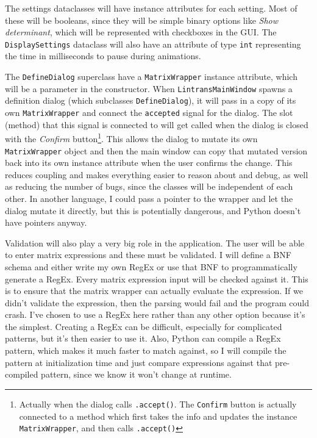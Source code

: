 \documentclass[../main.tex]{subfiles}
\begin{document}
The settings dataclasses will have instance attributes for each setting. Most of these will be booleans, since they will be simple binary options like \textit{Show determinant}, which will be represented with checkboxes in the GUI. The \texttt{DisplaySettings} dataclass will also have an attribute of type \texttt{int} representing the time in milliseconds to pause during animations.

The \texttt{DefineDialog} superclass have a \texttt{MatrixWrapper} instance attribute, which will be a parameter in the constructor. When \texttt{LintransMainWindow} spawns a definition dialog (which subclasses \texttt{DefineDialog}), it will pass in a copy of its own \texttt{MatrixWrapper} and connect the \texttt{accepted} signal for the dialog. The slot (method) that this signal is connected to will get called when the dialog is closed with the \textit{Confirm} button\footnote{Actually when the dialog calls \texttt{.accept()}. The \texttt{Confirm} button is actually connected to a method which first takes the info and updates the instance \texttt{MatrixWrapper}, and then calls \texttt{.accept()}}. This allows the dialog to mutate its own \texttt{MatrixWrapper} object and then the main window can copy that mutated version back into its own instance attribute when the user confirms the change. This reduces coupling and makes everything easier to reason about and debug, as well as reducing the number of bugs, since the classes will be independent of each other. In another language, I could pass a pointer to the wrapper and let the dialog mutate it directly, but this is potentially dangerous, and Python doesn't have pointers anyway.

Validation will also play a very big role in the application. The user will be able to enter matrix expressions and these must be validated. I will define a BNF schema and either write my own RegEx or use that BNF to programmatically generate a RegEx. Every matrix expression input will be checked against it. This is to ensure that the matrix wrapper can actually evaluate the expression. If we didn't validate the expression, then the parsing would fail and the program could crash. I've chosen to use a RegEx here rather than any other option because it's the simplest. Creating a RegEx can be difficult, especially for complicated patterns, but it's then easier to use it. Also, Python can compile a RegEx pattern, which makes it much faster to match against, so I will compile the pattern at initialization time and just compare expressions against that pre-compiled pattern, since we know it won't change at runtime.
\end{document}
